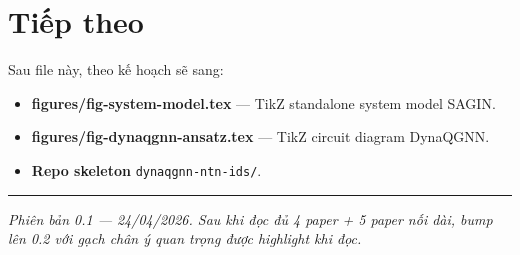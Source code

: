 \documentclass[11pt,a4paper]{article}
\begin{document}
\section{Tiếp theo}

Sau file này, theo kế hoạch sẽ sang:
\begin{itemize}
  \item \textbf{figures/fig-system-model.tex} --- TikZ standalone system model SAGIN.
  \item \textbf{figures/fig-dynaqgnn-ansatz.tex} --- TikZ circuit diagram DynaQGNN.
  \item \textbf{Repo skeleton} \texttt{dynaqgnn-ntn-ids/}.
\end{itemize}

\vspace{0.4cm}
\hrule
\vspace{0.3cm}
\textit{\small Phiên bản 0.1 --- 24/04/2026. Sau khi đọc đủ 4 paper + 5 paper nối dài, bump lên 0.2 với gạch chân ý quan trọng được highlight khi đọc.}
\end{document}
